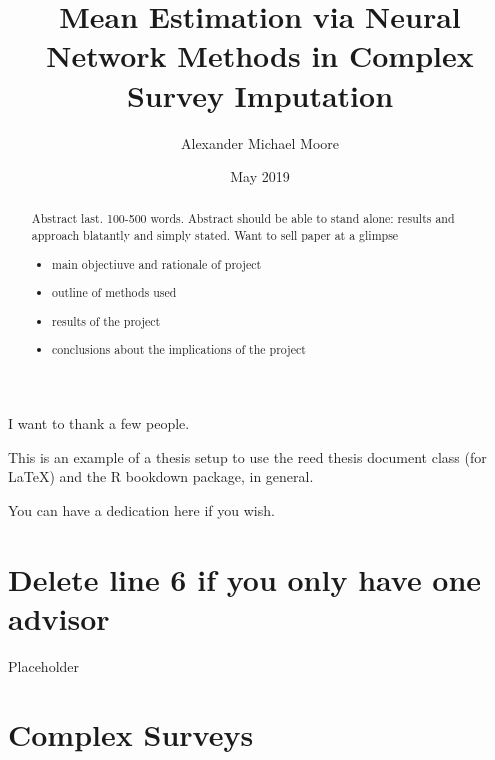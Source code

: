 \documentclass[12pt,twoside]{reedthesis}
\title{Mean Estimation via Neural Network Methods in Complex Survey Imputation}
\author{Alexander Michael Moore}
\date{May 2019}
\providecommand{\tightlist}{%
  \setlength{\itemsep}{0pt}\setlength{\parskip}{0pt}}
\begin{document}
  \maketitle

\frontmatter %
\pagestyle{empty} %
  \begin{acknowledgements}
    I want to thank a few people.
  \end{acknowledgements}
  \begin{preface}
    This is an example of a thesis setup to use the reed thesis document
    class (for LaTeX) and the R bookdown package, in general.
  \end{preface}
  \hypersetup{linkcolor=black}
  \setcounter{tocdepth}{2}
  \tableofcontents

  \listoftables

  \listoffigures
  \begin{abstract}
    Abstract last. 100-500 words. Abstract should be able to stand alone:
    results and approach blatantly and simply stated. Want to sell paper at
    a glimpse
    \begin{itemize}
    \tightlist
    \item
      main objectiuve and rationale of project
    \item
      outline of methods used
    \item
      results of the project
    \item
      conclusions about the implications of the project
    \end{itemize}
  \end{abstract}
  \begin{dedication}
    You can have a dedication here if you wish.
  \end{dedication}
\mainmatter %
\pagestyle{fancyplain} %

\chapter{Delete line 6 if you only have one
advisor}\label{delete-line-6-if-you-only-have-one-advisor}

Placeholder

\chapter{Complex Surveys}\label{complex-surveys}
\end{document}

